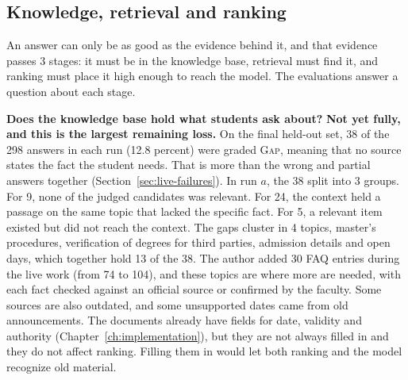 \subsection{Knowledge, retrieval and ranking}
\label{sec:knowledge-retrieval-ranking}

An answer can only be as good as the evidence behind it, and that evidence passes 3 stages: it must be in the knowledge base, retrieval must find it, and ranking must place it high enough to reach the model. The evaluations answer a question about each stage.

\textbf{Does the knowledge base hold what students ask about?} \textbf{Not yet fully, and this is the largest remaining loss.} On the final held-out set, 38 of the 298 answers in each run (12.8 percent) were graded \textsc{Gap}, meaning that no source states the fact the student needs. That is more than the wrong and partial answers together (Section~\ref{sec:live-failures}). In run $a$, the 38 split into 3 groups. For 9, none of the judged candidates was relevant. For 24, the context held a passage on the same topic that lacked the specific fact. For 5, a relevant item existed but did not reach the context. The gaps cluster in 4 topics, master's procedures, verification of degrees for third parties, admission details and open days, which together hold 13 of the 38. The author added 30 FAQ entries during the live work (from 74 to 104), and these topics are where more are needed, with each fact checked against an official source or confirmed by the faculty. Some sources are also outdated, and some unsupported dates came from old announcements. The documents already have fields for date, validity and authority (Chapter~\ref{ch:implementation}), but they are not always filled in and they do not affect ranking. Filling them in would let both ranking and the model recognize old material.

